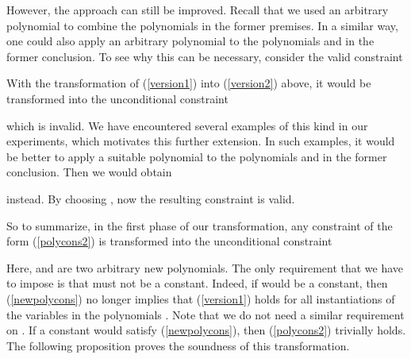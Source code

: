 \documentclass[envcountsame]{tlp}
\newcounter{polycons2ctr}
\newcounter{polycons1ctr}
\newcounter{ex:der-lastsymconsctr}
\begin{document}
However, the approach can still be improved.
Recall that we used an arbitrary polynomial  to combine the
polynomials in the former premises. In a similar way, one could also apply an
arbitrary polynomial   to the polynomials  and
 in
the former conclusion.
To see why this can be necessary, consider the valid constraint

With the transformation of (\ref{version1}) into 
(\ref{version2})
above, it would be transformed into the unconditional
constraint

which is invalid. 
We have encountered several examples of this kind in our experiments, 
which motivates this further extension. In such examples, it 
would be better to apply a suitable
polynomial   to the polynomials  and  in the former
conclusion. Then we would obtain

instead. By choosing , now the resulting constraint
is valid.

So to summarize, in the first phase of our transformation,
any constraint of the form
(\ref{polycons2})
is transformed into the  unconditional constraint

Here,  and  are two arbitrary
new polynomials. The only requirement that we have to impose is that
  must not be a constant. Indeed, if  would 
be a constant, then (\ref{newpolycons}) no longer implies that
(\ref{version1}) holds for all instantiations of the variables in the
polynomials . 
Note that we do not need a similar requirement on .
If a constant  would satisfy (\ref{newpolycons}), then 
(\ref{polycons2}) trivially holds.
 The following proposition proves the soundness of this transformation. 
\end{document}
